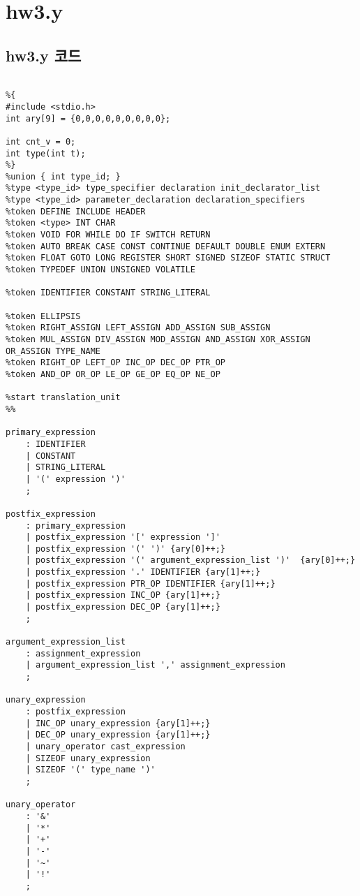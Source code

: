 \documentclass{article}
\begin{document}
\newpage 

\section{hw3.y}

\subsection{hw3.y 코드}
\begin{lstlisting}

%{
#include <stdio.h>
int ary[9] = {0,0,0,0,0,0,0,0,0};

int cnt_v = 0;
int type(int t);
%}
%union { int type_id; }
%type <type_id> type_specifier declaration init_declarator_list
%type <type_id> parameter_declaration declaration_specifiers 
%token DEFINE INCLUDE HEADER
%token <type> INT CHAR
%token VOID FOR WHILE DO IF SWITCH RETURN
%token AUTO BREAK CASE CONST CONTINUE DEFAULT DOUBLE ENUM EXTERN
%token FLOAT GOTO LONG REGISTER SHORT SIGNED SIZEOF STATIC STRUCT
%token TYPEDEF UNION UNSIGNED VOLATILE

%token IDENTIFIER CONSTANT STRING_LITERAL

%token ELLIPSIS
%token RIGHT_ASSIGN LEFT_ASSIGN ADD_ASSIGN SUB_ASSIGN
%token MUL_ASSIGN DIV_ASSIGN MOD_ASSIGN AND_ASSIGN XOR_ASSIGN OR_ASSIGN TYPE_NAME
%token RIGHT_OP LEFT_OP INC_OP DEC_OP PTR_OP
%token AND_OP OR_OP LE_OP GE_OP EQ_OP NE_OP

%start translation_unit
%%

primary_expression
	: IDENTIFIER
	| CONSTANT
	| STRING_LITERAL
	| '(' expression ')'
	;

postfix_expression
	: primary_expression
	| postfix_expression '[' expression ']'
	| postfix_expression '(' ')' {ary[0]++;}
	| postfix_expression '(' argument_expression_list ')'  {ary[0]++;}
	| postfix_expression '.' IDENTIFIER {ary[1]++;}
	| postfix_expression PTR_OP IDENTIFIER {ary[1]++;}
	| postfix_expression INC_OP {ary[1]++;}
	| postfix_expression DEC_OP {ary[1]++;}
	;

argument_expression_list
	: assignment_expression
	| argument_expression_list ',' assignment_expression
	;

unary_expression
	: postfix_expression
	| INC_OP unary_expression {ary[1]++;}
	| DEC_OP unary_expression {ary[1]++;}
	| unary_operator cast_expression 
	| SIZEOF unary_expression
	| SIZEOF '(' type_name ')'
	;

unary_operator
	: '&'
	| '*'
	| '+'
	| '-'
	| '~'
	| '!'
	;


\end{lstlisting}
\end{document}
